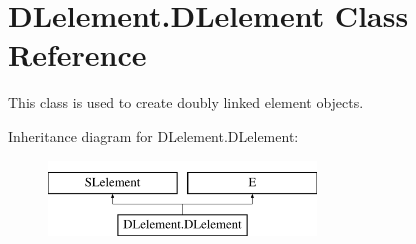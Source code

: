 \hypertarget{class_d_lelement_1_1_d_lelement}{}\section{D\+Lelement.\+D\+Lelement Class Reference}
\label{class_d_lelement_1_1_d_lelement}


This class is used to create doubly linked element objects.  


Inheritance diagram for D\+Lelement.\+D\+Lelement\+:\begin{figure}[H]
\begin{center}
\leavevmode
\includegraphics[height=2.000000cm]{class_d_lelement_1_1_d_lelement}
\end{center}
\end{figure}
